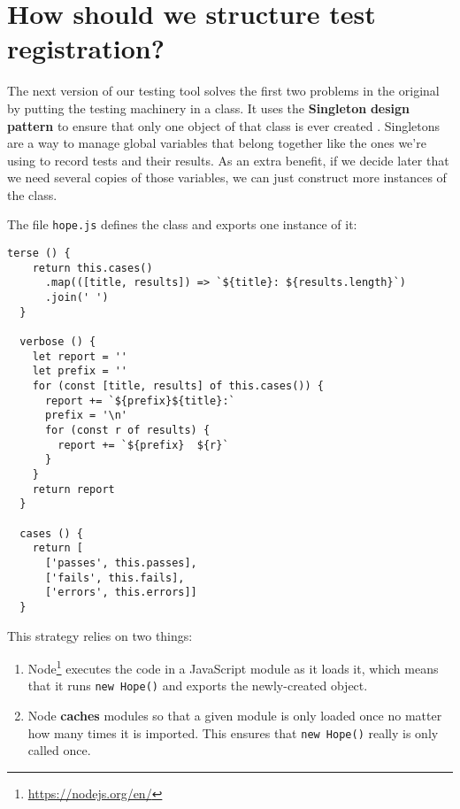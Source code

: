 \documentclass[krantzl]{krantz}
\newcommand{\glossref}[1]{\textbf{#1}}
\newcommand{\hreffoot}[2]{{#1}\footnote{\href{#2}{#2}}}
\begin{document}
\section{How should we structure test registration?}\label{unit-test-registration}


The next version of our testing tool solves the first two problems in the original
by putting the testing machinery in a class.
It uses the \glossref{Singleton} \glossref{design pattern}
to ensure that only one object of that class is ever created \cite{Osmani2017}.
Singletons are a way to manage global variables that belong together
like the ones we're using to record tests and their results.
As an extra benefit,
if we decide later that we need several copies of those variables,
we can just construct more instances of the class.


The file \texttt{hope.js} defines the class and exports one instance of it:


\begin{lstlisting}[frame=single,frameround=tttt]
  terse () {
    return this.cases()
      .map(([title, results]) => `${title}: ${results.length}`)
      .join(' ')
  }

  verbose () {
    let report = ''
    let prefix = ''
    for (const [title, results] of this.cases()) {
      report += `${prefix}${title}:`
      prefix = '\n'
      for (const r of results) {
        report += `${prefix}  ${r}`
      }
    }
    return report
  }

  cases () {
    return [
      ['passes', this.passes],
      ['fails', this.fails],
      ['errors', this.errors]]
  }
\end{lstlisting}



This strategy relies on two things:

\begin{enumerate}

\item 

\hreffoot{Node}{https://nodejs.org/en/} executes the code in a JavaScript module as it loads it,
    which means that it runs \texttt{new Hope()} and exports the newly-created object.



\item 

Node \glossref{caches} modules
    so that a given module is only loaded once
    no matter how many times it is imported.
    This ensures that \texttt{new Hope()} really is only called once.



\end{enumerate}
\end{document}
